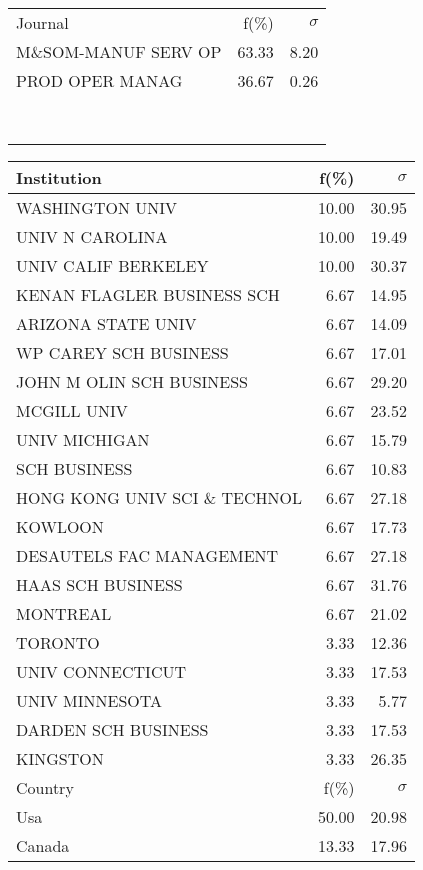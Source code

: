 \documentclass[a4paper,11pt]{report}
\begin{document}
\begin{landscape}
\begin{table}[!ht]
{\begin{tabular}{|l r r|}
 &  & \\
\hline
\hline
Journal & f(\%) & $\sigma$\\
\hline
M\&SOM-MANUF SERV OP & 63.33 & 8.20\\
PROD OPER MANAG & 36.67 & 0.26\\
 &  & \\
 &  & \\
 &  & \\
 &  & \\
 &  & \\
 &  & \\
 &  & \\
 &  & \\
\hline
\end{tabular}
}
{\scriptsize\begin{tabular}{|l r r|}
\hline
Institution & f(\%) & $\sigma$\\
\hline
WASHINGTON UNIV & 10.00 & 30.95\\
UNIV N CAROLINA & 10.00 & 19.49\\
UNIV CALIF BERKELEY & 10.00 & 30.37\\
KENAN FLAGLER BUSINESS SCH & 6.67 & 14.95\\
ARIZONA STATE UNIV & 6.67 & 14.09\\
WP CAREY SCH BUSINESS & 6.67 & 17.01\\
JOHN M OLIN SCH BUSINESS & 6.67 & 29.20\\
MCGILL UNIV & 6.67 & 23.52\\
UNIV MICHIGAN & 6.67 & 15.79\\
SCH BUSINESS & 6.67 & 10.83\\
HONG KONG UNIV SCI \& TECHNOL & 6.67 & 27.18\\
KOWLOON & 6.67 & 17.73\\
DESAUTELS FAC MANAGEMENT & 6.67 & 27.18\\
HAAS SCH BUSINESS & 6.67 & 31.76\\
MONTREAL & 6.67 & 21.02\\
TORONTO & 3.33 & 12.36\\
UNIV CONNECTICUT & 3.33 & 17.53\\
UNIV MINNESOTA & 3.33 & 5.77\\
DARDEN SCH BUSINESS & 3.33 & 17.53\\
KINGSTON & 3.33 & 26.35\\
\hline
\hline
Country & f(\%) & $\sigma$\\
\hline
Usa & 50.00 & 20.98\\
Canada & 13.33 & 17.96\\

\end{tabular}}
\end{table}
\end{landscape}
\end{document}
